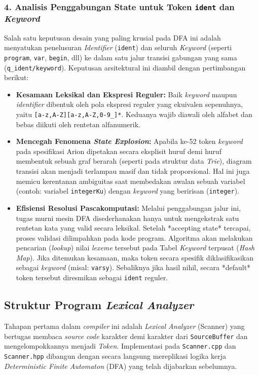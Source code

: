 \documentclass[12pt,a4paper]{article}
\begin{document}
\subsubsection*{4. Analisis Penggabungan State untuk Token \texttt{ident} dan \textit{Keyword}}
Salah satu keputusan desain yang paling krusial pada DFA ini adalah menyatukan penelusuran \textit{Identifier} (\texttt{ident}) dan seluruh \textit{Keyword} (seperti \texttt{program}, \texttt{var}, \texttt{begin}, dll) ke dalam satu jalur transisi gabungan yang sama (\texttt{q\_ident/keyword}). Keputusan arsitektural ini diambil dengan pertimbangan berikut:
\begin{itemize}
    \item \textbf{Kesamaan Leksikal dan Ekspresi Reguler:} Baik \textit{keyword} maupun \textit{identifier} dibentuk oleh pola ekspresi reguler yang ekuivalen sepenuhnya, yaitu \texttt{[a-z,A-Z][a-z,A-Z,0-9\_]*}. Keduanya wajib diawali oleh alfabet dan bebas diikuti oleh rentetan alfanumerik.
    \item \textbf{Mencegah Fenomena \textit{State Explosion}:} Apabila ke-52 token \textit{keyword} pada spesifikasi Arion dipetakan secara eksplisit huruf demi huruf membentuk sebuah graf berarah (seperti pada struktur data \textit{Trie}), diagram transisi akan menjadi terlampau masif dan tidak proporsional. Hal ini juga memicu kerentanan ambiguitas saat membedakan awalan sebuah variabel (contoh: variabel \texttt{integerKu}) dengan \textit{keyword} yang beririsan (\texttt{integer}).
    \item \textbf{Efisiensi Resolusi Pascakomputasi:} Melalui penggabungan jalur ini, tugas murni mesin DFA disederhanakan hanya untuk mengekstrak satu rentetan kata yang valid secara leksikal. Setelah *accepting state* tercapai, proses validasi dilimpahkan pada kode program. Algoritma akan melakukan pencarian (\textit{lookup}) nilai \textit{lexeme} tersebut pada Tabel \textit{Keyword} terpusat (\textit{Hash Map}). Jika ditemukan kesamaan, maka token secara spesifik diklasifikasikan sebagai \textit{keyword} (misal: \texttt{varsy}). Sebaliknya jika hasil nihil, secara *default* token tersebut diresmikan sebagai \texttt{ident} reguler.
\end{itemize}

\subsection{Struktur Program \textit{Lexical Analyzer}}

Tahapan pertama dalam \textit{compiler} ini adalah \textit{Lexical Analyzer} (Scanner) yang bertugas membaca \textit{source code} karakter demi karakter dari \texttt{SourceBuffer} dan mengelompokkannya menjadi \textit{Token}. Implementasi pada \texttt{Scanner.cpp} dan \texttt{Scanner.hpp} dibangun dengan secara langsung mereplikasi logika kerja \textit{Deterministic Finite Automaton} (DFA) yang telah dijabarkan sebelumnya.
\end{document}
